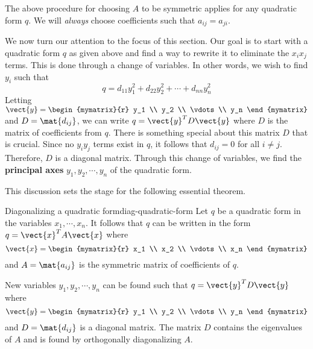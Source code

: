 The above procedure for choosing $A$ to be symmetric applies for any quadratic form $q$. We will \textit{always} choose coefficients such that $a_{ij}=a_{ji}$. 

We now turn our attention to the focus of this section. Our goal is to start with a quadratic form $q$ as given above and find a way to rewrite it to eliminate the $x_ix_j$ terms. This is done through a change of variables. In other words, we wish to find $y_i$ such that 
\[
q = d_{11}y_1^2 + d_{22}y_2^2 + \cdots + d_{nn}y_n^2
\]
 Letting $\vect{y} = \begin{mymatrix}{r}
y_1 \\
y_2 \\
\vdots \\
y_n
\end{mymatrix}$ and $D = \mat{d_{ij} }$, we can write $q = \vect{y}^T D \vect{y}$ where $D$ is the matrix of coefficients from $q$. There is something special about this matrix $D$ that is crucial. Since no $y_iy_j$ terms exist in $q$, it follows that $d_{ij} = 0$ for all $i \neq j$. Therefore, $D$ is a diagonal matrix. Through this change of variables, we find the \textbf{principal axes} $y_1, y_2, \cdots, y_n$ of the quadratic form. 

This discussion sets the stage for the following essential theorem.

\begin{theorem}{Diagonalizing a quadratic form}{diag-quadratic-form}
Let $q$ be a quadratic form in the variables $x_1, \cdots, x_n$. It follows that $q$ can be written in the form $q = \vect{x}^T A \vect{x}$ where 
\[
\vect{x} = \begin{mymatrix}{r}
x_1 \\
x_2 \\
\vdots \\
x_n
\end{mymatrix} 
\]
and $A = \mat{a_{ij} }$ is the symmetric matrix of coefficients of $q$. 

New variables $y_1, y_2, \cdots, y_n$ can be found such that $q = \vect{y}^T D \vect{y}$ where 
\[
\vect{y} = \begin{mymatrix}{r} 
y_1 \\
y_2 \\
\vdots \\
y_n
\end{mymatrix} \] and $D=\mat{d_{ij} }$ is a diagonal matrix. The matrix $D$ contains the eigenvalues of $A$ and is found by orthogonally diagonalizing $A$. 
\end{theorem}

